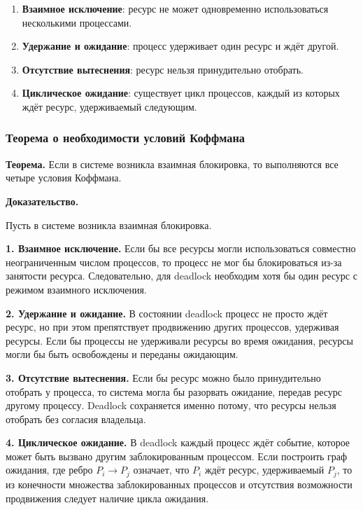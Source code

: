 \documentclass[12pt,a4paper]{article}
\begin{document}
\begin{enumerate}
    \item \textbf{Взаимное исключение}: ресурс не может одновременно использоваться несколькими процессами.
    \item \textbf{Удержание и ожидание}: процесс удерживает один ресурс и ждёт другой.
    \item \textbf{Отсутствие вытеснения}: ресурс нельзя принудительно отобрать.
    \item \textbf{Циклическое ожидание}: существует цикл процессов, каждый из которых ждёт ресурс, удерживаемый следующим.
\end{enumerate}

\subsubsection{Теорема о необходимости условий Коффмана}

\textbf{Теорема.}
Если в системе возникла взаимная блокировка, то выполняются все четыре условия Коффмана.

\textbf{Доказательство.}

Пусть в системе возникла взаимная блокировка.

\textbf{1. Взаимное исключение.}
Если бы все ресурсы могли использоваться совместно неограниченным числом процессов, то процесс не мог бы блокироваться из-за занятости ресурса. Следовательно, для deadlock необходим хотя бы один ресурс с режимом взаимного исключения.

\textbf{2. Удержание и ожидание.}
В состоянии deadlock процесс не просто ждёт ресурс, но при этом препятствует продвижению других процессов, удерживая ресурсы. Если бы процессы не удерживали ресурсы во время ожидания, ресурсы могли бы быть освобождены и переданы ожидающим.

\textbf{3. Отсутствие вытеснения.}
Если бы ресурс можно было принудительно отобрать у процесса, то система могла бы разорвать ожидание, передав ресурс другому процессу. Deadlock сохраняется именно потому, что ресурсы нельзя отобрать без согласия владельца.

\textbf{4. Циклическое ожидание.}
В deadlock каждый процесс ждёт событие, которое может быть вызвано другим заблокированным процессом. Если построить граф ожидания, где ребро $P_i \rightarrow P_j$ означает, что $P_i$ ждёт ресурс, удерживаемый $P_j$, то из конечности множества заблокированных процессов и отсутствия возможности продвижения следует наличие цикла ожидания.
\end{document}
